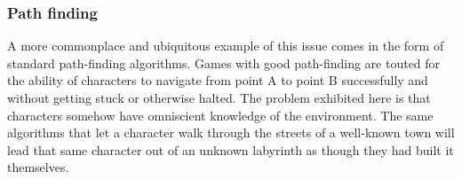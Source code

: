 \subsubsection{Path finding}

A more commonplace and ubiquitous example of this issue comes in the form of standard path-finding algorithms. Games with good path-finding are touted for the ability of characters to navigate from point A to point B successfully and without getting stuck or otherwise halted. The problem exhibited here is that characters somehow have omniscient knowledge of the environment. The same algorithms that let a character walk through the streets of a well-known town will lead that same character out of an unknown labyrinth as though they had built it themselves.
